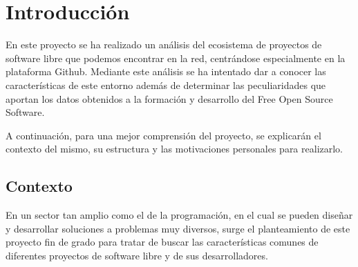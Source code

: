 \documentclass[a4paper, spanish, 12pt]{book}
\begin{document}


\tableofcontents
\cleardoublepage
\listoffigures %



\cleardoublepage
\chapter{Introducci\'on}
\label{sec:intro} %

En este proyecto se ha realizado un an\'alisis del ecosistema de proyectos de
software libre que podemos encontrar en la red, centr\'andose especialmente en
la plataforma Github. Mediante este an\'alisis se ha intentado dar a conocer las
caracter\'isticas de este entorno adem\'as de determinar las peculiaridades que
aportan los datos obtenidos a la formaci\'on y desarrollo del Free Open Source Software.

A continuaci\'on, para una mejor comprensi\'on del proyecto, se explicar\'an el
contexto del mismo, su estructura y las motivaciones personales para realizarlo.

\section{Contexto}
\label{sec:contexto}

En un sector tan amplio como el de la programaci\'on, en el cual se pueden dise\~nar
y desarrollar soluciones a problemas muy diversos, surge el planteamiento de este
proyecto fin de grado para tratar de buscar las caracter\'isticas comunes de
diferentes proyectos de software libre y de sus desarrolladores.
\end{document}
